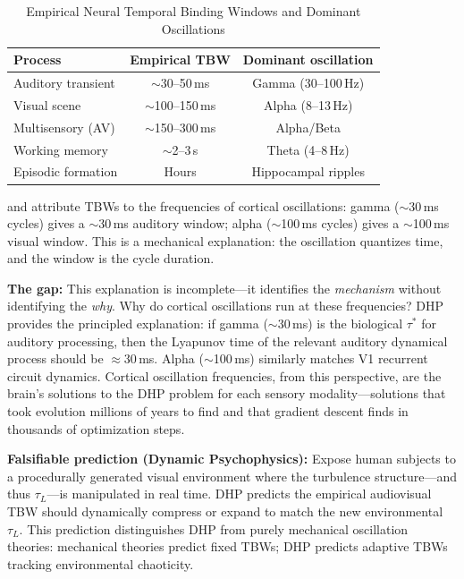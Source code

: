 \documentclass[12pt]{article}
\begin{document}
\begin{table}[H]
\centering
\caption{Empirical Neural Temporal Binding Windows and Dominant Oscillations}
\label{tab:tbw}
\begin{tabular}{@{}lcc@{}}
\toprule
Process & Empirical TBW & Dominant oscillation \\
\midrule
Auditory transient   & $\sim$30--50\,ms  & Gamma (30--100\,Hz) \\
Visual scene         & $\sim$100--150\,ms & Alpha (8--13\,Hz) \\
Multisensory (AV)    & $\sim$150--300\,ms & Alpha/Beta \\
Working memory       & $\sim$2--3\,s      & Theta (4--8\,Hz) \\
Episodic formation   & Hours              & Hippocampal ripples \\
\bottomrule
\end{tabular}
\end{table}

\citet{poppel1997hierarchical} and \citet{vanrullen2003perception} attribute TBWs to the
frequencies of cortical oscillations: gamma ($\sim$30\,ms cycles) gives a $\sim$30\,ms
auditory window; alpha ($\sim$100\,ms cycles) gives a $\sim$100\,ms visual window. This is
a mechanical explanation: the oscillation quantizes time, and the window is the cycle
duration.

\textbf{The gap:} This explanation is incomplete---it identifies the \emph{mechanism}
without identifying the \emph{why}. Why do cortical oscillations run at these frequencies?
DHP provides the principled explanation: if gamma ($\sim$30\,ms) is the biological $\tau^*$
for auditory processing, then the Lyapunov time of the relevant auditory dynamical process
should be $\approx$30\,ms. Alpha ($\sim$100\,ms) similarly matches V1 recurrent circuit
dynamics. Cortical oscillation frequencies, from this perspective, are the brain's solutions
to the DHP problem for each sensory modality---solutions that took evolution millions of
years to find and that gradient descent finds in thousands of optimization steps.

\textbf{Falsifiable prediction (Dynamic Psychophysics):} Expose human subjects to a
procedurally generated visual environment where the turbulence structure---and thus
$\tau_L$---is manipulated in real time. DHP predicts the empirical audiovisual TBW should
dynamically compress or expand to match the new environmental $\tau_L$. This prediction
distinguishes DHP from purely mechanical oscillation theories: mechanical theories predict
fixed TBWs; DHP predicts adaptive TBWs tracking environmental chaoticity.
\end{document}
